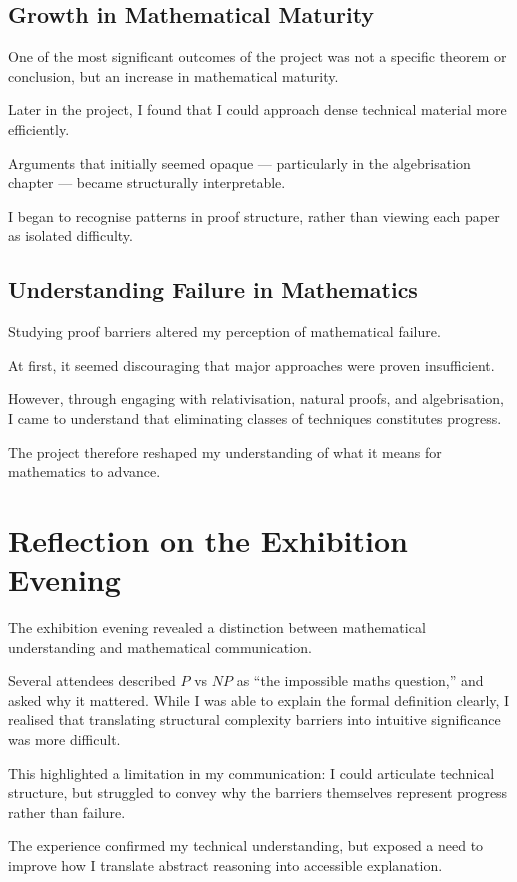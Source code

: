 \documentclass[12pt]{article}
\begin{document}
\subsection*{Growth in Mathematical Maturity}

One of the most significant outcomes of the project was not a specific theorem or conclusion, but an increase in mathematical maturity.

Later in the project, I found that I could approach dense technical material more efficiently.

Arguments that initially seemed opaque --- particularly in the algebrisation chapter --- became structurally interpretable.

I began to recognise patterns in proof structure, rather than viewing each paper as isolated difficulty.

\subsection*{Understanding Failure in Mathematics}

Studying proof barriers altered my perception of mathematical failure.

At first, it seemed discouraging that major approaches were proven insufficient.

However, through engaging with relativisation, natural proofs, and algebrisation, I came to understand that eliminating classes of techniques constitutes progress.

The project therefore reshaped my understanding of what it means for mathematics to advance.

\section{Reflection on the Exhibition Evening}
The exhibition evening revealed a distinction between mathematical understanding and mathematical communication.

Several attendees described $P$ vs $NP$ as “the impossible maths question,” and asked why it mattered. While I was able to explain the formal definition clearly, I realised that translating structural complexity barriers into intuitive significance was more difficult.

This highlighted a limitation in my communication: I could articulate technical structure, but struggled to convey why the barriers themselves represent progress rather than failure.

The experience confirmed my technical understanding, but exposed a need to improve how I translate abstract reasoning into accessible explanation.
\end{document}
